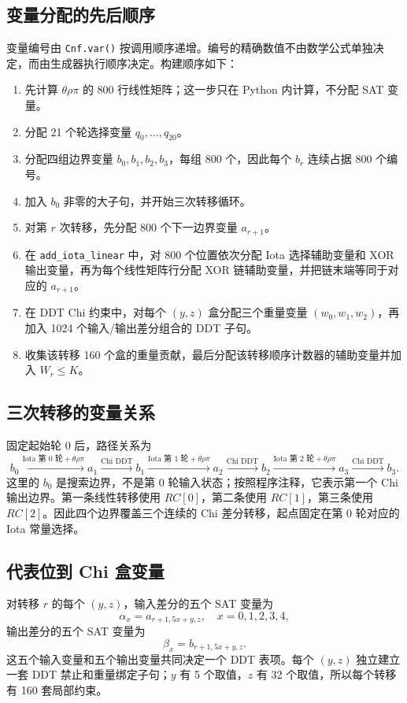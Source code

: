 \documentclass[UTF8,a4paper]{ctexart}
\begin{document}
\subsection{变量分配的先后顺序}
变量编号由 \texttt{Cnf.var()} 按调用顺序递增。编号的精确数值不由数学公式单独决定，而由生成器执行顺序决定。构建顺序如下：
\begin{enumerate}
\item 先计算 \(\theta\rho\pi\) 的 800 行线性矩阵；这一步只在 Python 内计算，不分配 SAT 变量。
\item 分配 21 个轮选择变量 \(q_0,\ldots,q_{20}\)。
\item 分配四组边界变量 \(b_0,b_1,b_2,b_3\)，每组 800 个，因此每个 \(b_r\) 连续占据 800 个编号。
\item 加入 \(b_0\) 非零的大子句，并开始三次转移循环。
\item 对第 \(r\) 次转移，先分配 800 个下一边界变量 \(a_{r+1}\)。
\item 在 \texttt{add\_iota\_linear} 中，对 800 个位置依次分配 Iota 选择辅助变量和 XOR 输出变量，再为每个线性矩阵行分配 XOR 链辅助变量，并把链末端等同于对应的 \(a_{r+1}\)。
\item 在 DDT Chi 约束中，对每个 \((y,z)\) 盒分配三个重量变量 \((w_0,w_1,w_2)\)，再加入 1024 个输入/输出差分组合的 DDT 子句。
\item 收集该转移 160 个盒的重量贡献，最后分配该转移顺序计数器的辅助变量并加入 \(W_r\le K\)。
\end{enumerate}

\subsection{三次转移的变量关系}
固定起始轮 0 后，路径关系为
\[
b_0\xrightarrow{\text{Iota 第 0 轮}+\theta\rho\pi}a_1
\xrightarrow{\text{Chi DDT}}b_1
\xrightarrow{\text{Iota 第 1 轮}+\theta\rho\pi}a_2
\xrightarrow{\text{Chi DDT}}b_2
\xrightarrow{\text{Iota 第 2 轮}+\theta\rho\pi}a_3
\xrightarrow{\text{Chi DDT}}b_3.
\]
这里的 \(b_0\) 是搜索边界，不是第 0 轮输入状态；按照程序注释，它表示第一个 Chi 输出边界。第一条线性转移使用 \(RC[0]\)，第二条使用 \(RC[1]\)，第三条使用 \(RC[2]\)。因此四个边界覆盖三个连续的 Chi 差分转移，起点固定在第 0 轮对应的 Iota 常量选择。

\subsection{代表位到 Chi 盒变量}
对转移 \(r\) 的每个 \((y,z)\)，输入差分的五个 SAT 变量为
\[
\alpha_x=a_{r+1,5x+y,z},\quad x=0,1,2,3,4,
\]
输出差分的五个 SAT 变量为
\[
\beta_x=b_{r+1,5x+y,z}.
\]
这五个输入变量和五个输出变量共同决定一个 DDT 表项。每个 \((y,z)\) 独立建立一套 DDT 禁止和重量绑定子句；\(y\) 有 5 个取值，\(z\) 有 32 个取值，所以每个转移有 160 套局部约束。
\end{document}
